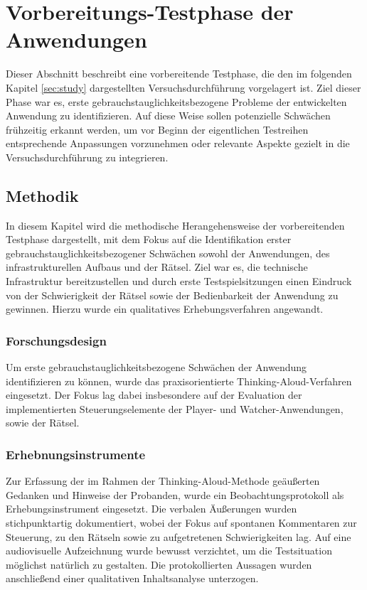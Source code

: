 \chapter{Vorbereitungs-Testphase der Anwendungen}\label{sec:pre-study}

Dieser Abschnitt beschreibt eine vorbereitende Testphase, die den im folgenden Kapitel \ref{sec:study} dargestellten Versuchsdurchführung vorgelagert ist. Ziel dieser Phase war es, erste gebrauchstauglichkeitsbezogene Probleme der entwickelten Anwendung zu identifizieren. Auf diese Weise sollen potenzielle Schwächen frühzeitig erkannt werden, um vor Beginn der eigentlichen Testreihen entsprechende Anpassungen vorzunehmen oder relevante Aspekte gezielt in die Versuchsdurchführung zu integrieren.

\section{Methodik}
In diesem Kapitel wird die methodische Herangehensweise der vorbereitenden Testphase dargestellt, mit dem Fokus auf die Identifikation erster gebrauchstauglichkeitsbezogener Schwächen sowohl der Anwendungen, des infrastrukturellen Aufbaus und der Rätsel. Ziel war es, die technische Infrastruktur bereitzustellen und durch erste Testspielsitzungen einen Eindruck von der Schwierigkeit der Rätsel sowie der Bedienbarkeit der Anwendung zu gewinnen. Hierzu wurde ein qualitatives Erhebungsverfahren angewandt.

\subsection{Forschungsdesign}

Um erste gebrauchstauglichkeitsbezogene Schwächen der Anwendung identifizieren zu können, wurde das praxisorientierte Thinking-Aloud-Verfahren eingesetzt. Der Fokus lag dabei insbesondere auf der Evaluation der implementierten Steuerungselemente der Player- und Watcher-Anwendungen, sowie der Rätsel.

\subsection{Erhebnungsinstrumente}

Zur Erfassung der im Rahmen der Thinking-Aloud-Methode geäußerten Gedanken und Hinweise der Probanden, wurde ein Beobachtungsprotokoll als Erhebungsinstrument eingesetzt. Die verbalen Äußerungen wurden stichpunktartig dokumentiert, wobei der Fokus auf spontanen Kommentaren zur Steuerung, zu den Rätseln sowie zu aufgetretenen Schwierigkeiten lag. Auf eine audiovisuelle Aufzeichnung wurde bewusst verzichtet, um die Testsituation möglichst natürlich zu gestalten. Die protokollierten Aussagen wurden anschließend einer qualitativen Inhaltsanalyse unterzogen.

